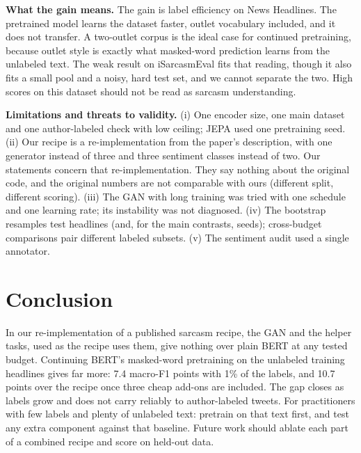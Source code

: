 \documentclass[conference]{IEEEtran}
\begin{document}
\textbf{What the gain means.} The gain is label efficiency on News Headlines. The pretrained model learns the dataset faster, outlet vocabulary included, and it does not transfer. A two-outlet corpus is the ideal case for continued pretraining, because outlet style is exactly what masked-word prediction learns from the unlabeled text. The weak result on iSarcasmEval fits that reading, though it also fits a small pool and a noisy, hard test set, and we cannot separate the two. High scores on this dataset should not be read as sarcasm understanding.

\textbf{Limitations and threats to validity.} (i) One encoder size, one main dataset and one author-labeled check with low ceiling; JEPA used one pretraining seed. (ii) Our recipe is a re-implementation from the paper's description, with one generator instead of three and three sentiment classes instead of two. Our statements concern that re-implementation. They say nothing about the original code, and the original numbers are not comparable with ours (different split, different scoring). (iii) The GAN with long training was tried with one schedule and one learning rate; its instability was not diagnosed. (iv) The bootstrap resamples test headlines (and, for the main contrasts, seeds); cross-budget comparisons pair different labeled subsets. (v) The sentiment audit used a single annotator.

\section{Conclusion}

In our re-implementation of a published sarcasm recipe, the GAN and the helper tasks, used as the recipe uses them, give nothing over plain BERT at any tested budget. Continuing BERT's masked-word pretraining on the unlabeled training headlines gives far more: 7.4 macro-F1 points with 1\% of the labels, and 10.7 points over the recipe once three cheap add-ons are included. The gap closes as labels grow and does not carry reliably to author-labeled tweets. For practitioners with few labels and plenty of unlabeled text: pretrain on that text first, and test any extra component against that baseline. Future work should ablate each part of a combined recipe and score on held-out data.



\end{document}
